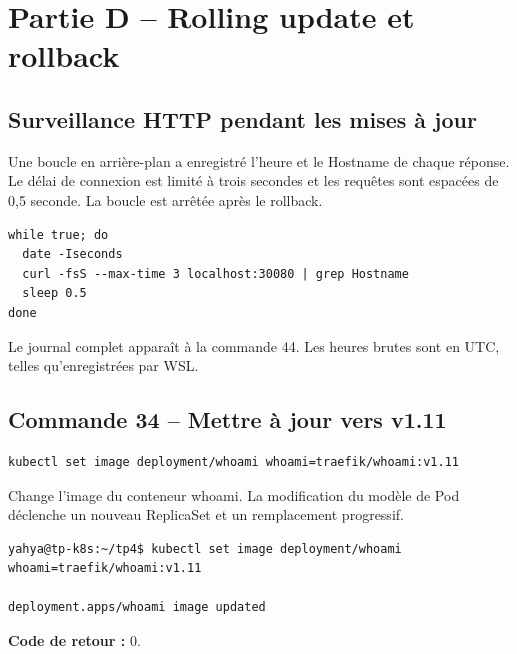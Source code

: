 \documentclass[11pt,a4paper]{article}
\begin{document}
\clearpage
\section{Partie D -- Rolling update et rollback}

\subsection{Surveillance HTTP pendant les mises à jour}
Une boucle en arrière-plan a enregistré l'heure et le Hostname de chaque réponse. Le délai de connexion est limité à trois secondes et les requêtes sont espacées de 0,5 seconde. La boucle est arrêtée après le rollback.
\begin{lstlisting}
while true; do
  date -Iseconds
  curl -fsS --max-time 3 localhost:30080 | grep Hostname
  sleep 0.5
done
\end{lstlisting}
Le journal complet apparaît à la commande 44. Les heures brutes sont en UTC, telles qu'enregistrées par WSL.

\subsection{Commande 34 -- Mettre à jour vers v1.11}
\begin{lstlisting}
kubectl set image deployment/whoami whoami=traefik/whoami:v1.11
\end{lstlisting}
Change l’image du conteneur whoami. La modification du modèle de Pod déclenche un nouveau ReplicaSet et un remplacement progressif.
\begin{tcolorbox}[terminal,title={Ubuntu / WSL2 -- Commande 34 -- rendu reconstitué}]
\begin{Verbatim}[fontsize=\scriptsize,breaklines=true,breakanywhere=true,breaksymbolleft={},breaksymbolright={}]
yahya@tp-k8s:~/tp4$ kubectl set image deployment/whoami whoami=traefik/whoami:v1.11

deployment.apps/whoami image updated
\end{Verbatim}
\end{tcolorbox}
\textbf{Code de retour :} 0.
\end{document}
